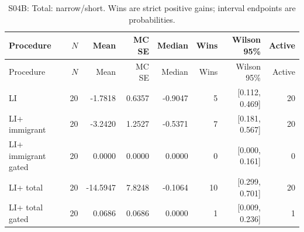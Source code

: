 \begin{longtable}{@{}lrrrrrrr@{}}

\caption{S04B: Total: narrow/short. Wins are strict positive gains; interval endpoints are probabilities.}\label{tab:s04b-6}\\

\toprule Procedure & $N$ & Mean & MC SE & Median & Wins & Wilson 95\% & Active \\

\midrule\endfirsthead

\toprule Procedure & $N$ & Mean & MC SE & Median & Wins & Wilson 95\% & Active \\

\midrule\endhead

\bottomrule\endlastfoot

LI & 20 & -1.7818 & 0.6357 & -0.9047 & 5 & [0.112, 0.469] & 20 \\

LI+ immigrant & 20 & -3.2420 & 1.2527 & -0.5371 & 7 & [0.181, 0.567] & 20 \\

LI+ immigrant gated & 20 & 0.0000 & 0.0000 & 0.0000 & 0 & [0.000, 0.161] & 0 \\

LI+ total & 20 & -14.5947 & 7.8248 & -0.1064 & 10 & [0.299, 0.701] & 20 \\

LI+ total gated & 20 & 0.0686 & 0.0686 & 0.0000 & 1 & [0.009, 0.236] & 1 \\

\end{longtable}\endgroup

\begingroup\footnotesize\setlength{\tabcolsep}{3pt}


